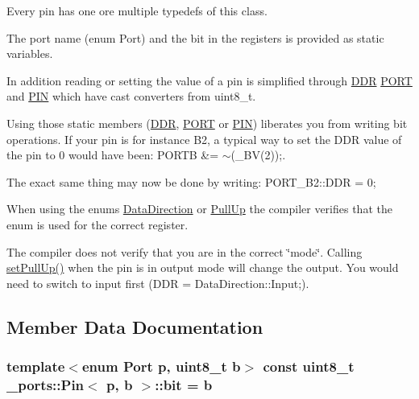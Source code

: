 Every pin has one ore multiple typedefs of this class. 

The port name (enum Port) and the bit in the registers is provided as static variables.

In addition reading or setting the value of a pin is simplified through \hyperlink{struct__ports_1_1Pin_a98b2b6c1bbac0b66435fa91223add866}{D\+DR} \hyperlink{struct__ports_1_1Pin_a7ae4c8a631070ea0652b8ea59416bc37}{P\+O\+RT} and \hyperlink{struct__ports_1_1Pin_abb249dc14ab80843a95913e7c513dcf9}{P\+IN} which have cast converters from uint8\+\_\+t.

Using those static members (\hyperlink{struct__ports_1_1Pin_a98b2b6c1bbac0b66435fa91223add866}{D\+DR}, \hyperlink{struct__ports_1_1Pin_a7ae4c8a631070ea0652b8ea59416bc37}{P\+O\+RT} or \hyperlink{struct__ports_1_1Pin_abb249dc14ab80843a95913e7c513dcf9}{P\+IN}) liberates you from writing bit operations. If your pin is for instance B2, a typical way to set the D\+DR value of the pin to 0 would have been\+: {\ttfamily P\+O\+R\+TB \&= $\sim$(\+\_\+\+B\+V(2));}.

The exact same thing may now be done by writing\+: {\ttfamily P\+O\+R\+T\+\_\+\+B2\+::\+D\+DR = 0;}

When using the enums \hyperlink{namespace__ports_a20e5153351b42b5fd86473fa045c98ea}{Data\+Direction} or \hyperlink{namespace__ports_a39c7c69d8e84949d7f7680e5b25a3742}{Pull\+Up} the compiler verifies that the enum is used for the correct register.

The compiler does not verify that you are in the correct \char`\"{}mode\char`\"{}. Calling \hyperlink{struct__ports_1_1Pin_a988f86c22bb2ad936fb3f1e88ff69b73}{set\+Pull\+Up()} when the pin is in output mode will change the output. You would need to switch to input first ({\ttfamily D\+DR = Data\+Direction\+::\+Input;}). 

\subsection{Member Data Documentation}
\subsubsection[{\texorpdfstring{bit}{bit}}]{\setlength{\rightskip}{0pt plus 5cm}template$<$enum Port p, uint8\+\_\+t b$>$ const uint8\+\_\+t {\bf \+\_\+ports\+::\+Pin}$<$ p, b $>$\+::bit = b\hspace{0.3cm}{\ttfamily [static]}}\hypertarget{struct__ports_1_1Pin_acfe940a7c850df557698dc99a745df5e}{}\label{struct__ports_1_1Pin_acfe940a7c850df557698dc99a745df5e}


